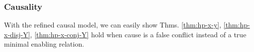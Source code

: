 \subsubsection{Causality}

With the refined causal model, we can easily show
Thms. \ref{thm:hp-x-y}, \ref{thm:hp-x-disj-Y}, \ref{thm:hp-x-conj-Y} hold
when cause is a false conflict instead of a true minimal enabling relation.


